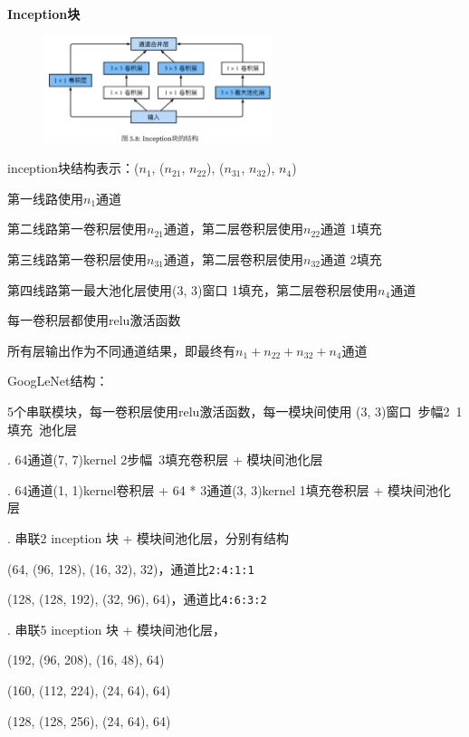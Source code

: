 \documentclass[UTF8]{ctexart}
\begin{document}
  \textbf{Inception块}
  \begin{figure}[H] %
    \centering %
    \includegraphics[width=0.6\textwidth]{note_images/inception_block.png} %
  \end{figure}

  \quad inception块结构表示：($n_1$, ($n_{21}$, $n_{22}$), ($n_{31}$, $n_{32}$), $n_4$) 
  
  \quad \quad 第一线路使用$n_1$通道
 
  \quad \quad 第二线路第一卷积层使用$n_{21}$通道，第二层卷积层使用$n_{22}$通道 1填充
 
  \quad \quad 第三线路第一卷积层使用$n_{31}$通道，第二层卷积层使用$n_{32}$通道 2填充
  
  \quad \quad 第四线路第一最大池化层使用(3, 3)窗口 1填充，第二层卷积层使用$n_4$通道

  \quad 每一卷积层都使用relu激活函数

  \quad 所有层输出作为不同通道结果，即最终有$n_1 + n_{22} + n_{32} + n_4$通道

  GoogLeNet结构：

  \quad 5个串联模块，每一卷积层使用relu激活函数，每一模块间使用 (3, 3)窗口\ 步幅2\ 1填充\ 池化层

  . 64通道(7, 7)kernel 2步幅\ 3填充卷积层 + 模块间池化层

  . 64通道(1, 1)kernel卷积层 + 64 * 3通道(3, 3)kernel 1填充卷积层 + 模块间池化层

  . 串联2 inception 块 + 模块间池化层，分别有结构

  \quad \quad (64, (96, 128), (16, 32), 32)，通道比\texttt{2:4:1:1}

  \quad \quad (128, (128, 192), (32, 96), 64)，通道比\texttt{4:6:3:2}

  . 串联5 inception 块 + 模块间池化层，

  \quad \quad (192, (96, 208), (16, 48), 64)

  \quad \quad (160, (112, 224), (24, 64), 64)

  \quad \quad (128, (128, 256), (24, 64), 64)
\end{document}
